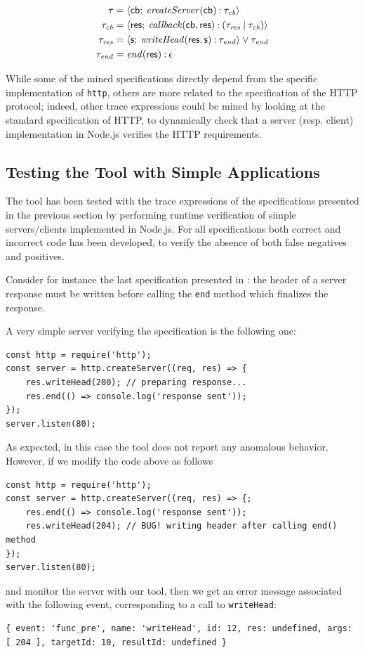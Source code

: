 \begin{itemize}
	\begin{align*}
		\tau &= {\langle}\mathsf{\mathsf{cb}};\:{\mathit{createServer}(\mathsf{cb}) \mathbin{:} \tau_{\mathit{cb}}}{\rangle}\\
		\tau_{\mathit{cb}} &= {\langle}\mathsf{ \mathsf{res} };\:{ \mathit{callback}(\mathsf{cb}, \mathsf{res}) \mathbin{:} (\tau_{\mathit{res}} \mathbin{|} \tau_{\mathit{cb}}) }{\rangle}\\
		\tau_{\mathit{res}} &= {\langle}\mathsf{s};\:{\mathit{writeHead}(\mathsf{res}, \mathsf{s}) \mathbin{:} \tau_{\mathit{end}}}{\rangle} \mathbin{\vee} \tau_{\mathit{end}}\\
		\tau_{\mathit{end}} &= \mathit{end}(\mathsf{res}) \mathbin{:} \epsilon
	\end{align*}
\end{itemize}
While some of the mined specifications directly depend from the specific implementation of \lstinline{http}, others
are more related to the specification of the HTTP protocol; indeed, other trace expressions could be mined by looking at the
standard specification of HTTP, to dynamically check that a server (resp. client) implementation in Node.js verifies the HTTP
requirements.

\subsection{Testing the Tool with Simple Applications}
\label{sec:simple-test}
The tool has been tested with the trace expressions of the specifications presented in the previous section by performing
runtime verification of simple servers/clients implemented in Node.js.
For all specifications both correct and incorrect code has been developed, to verify the absence of both false negatives and positives.

Consider for instance the last specification presented in :
the header of a server response must be written before calling the \lstinline{end} method which finalizes the response.

A very simple server verifying the specification is the following one:
\begin{lstlisting}
const http = require('http');
const server = http.createServer((req, res) => {
	res.writeHead(200); // preparing response...
	res.end(() => console.log('response sent'));
});
server.listen(80);
\end{lstlisting}

As expected, in this case the tool does not report any anomalous behavior.
However, if we modify the code above as follows
\begin{lstlisting}
const http = require('http');
const server = http.createServer((req, res) => {;
	res.end(() => console.log('response sent'));
	res.writeHead(204); // BUG! writing header after calling end() method
});
server.listen(80);
\end{lstlisting}
and monitor the server with our tool, then we get an error message associated with the following event, corresponding
to a call to \lstinline{writeHead}:
\begin{lstlisting}
{ event: 'func_pre', name: 'writeHead', id: 12, res: undefined, args: [ 204 ], targetId: 10, resultId: undefined }
\end{lstlisting}

